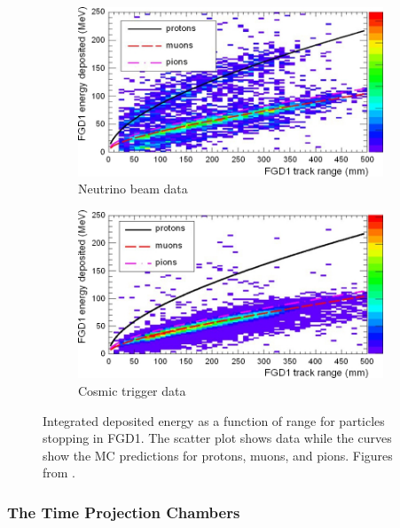 \begin{figure}
\centering
\hspace{0.7cm}
\begin{subfigure}{.7\textwidth}
\centering
  \includegraphics[width=0.95\linewidth]{figs/FGD1beam}
  \caption{Neutrino beam data}
  \label{fig:fgd1beam}
\end{subfigure}
\newline
\begin{subfigure}{.7\textwidth}
  \includegraphics[width=0.95\linewidth]{figs/FGD1cosmic}
  \caption{Cosmic trigger data}
  \label{fig:FGD1cosmic}
\end{subfigure}
\caption{Integrated deposited energy as a function of range for particles stopping in FGD1. The scatter plot shows data while the curves show the MC predictions for protons, muons, and pions. Figures from \cite{AMAUDRUZ20121}.}
\label{fig:FGD1}
\end{figure}

\subsubsection{The Time Projection Chambers}\label{sec:tpc}

